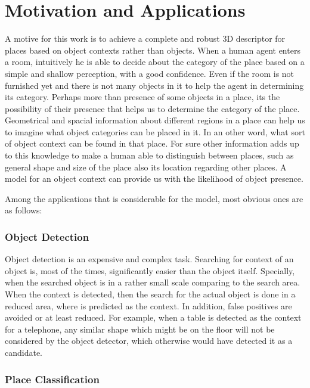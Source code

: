 \section{Motivation and Applications}
\label{MotivationandApplications.sec}
A motive for this work is to achieve a complete and robust 3D descriptor for places based on object contexts 
rather than objects. 
When a human agent enters a room, intuitively he is able to decide about the category of the place based on a simple and 
shallow perception, with a good confidence. 
Even if the room is not furnished yet and there is not many objects in it to help the agent in determining its 
category. 
Perhaps more than presence of some objects in a place, its the possibility of their presence that helps us 
to determine the category of the place. Geometrical and spacial information about different regions in a place can help us to imagine what object categories can be placed in it. In an other word, what sort of object context can be found in that place. 
For sure other information adds up to this knowledge to make a human able to distinguish between places, such as general 
shape and size of the place also its location regarding other places. 
A model for an object context can provide us with the likelihood of object presence.

Among the applications that is considerable for the model, most obvious ones are as follows:


\subsubsection*{Object Detection}

Object detection is an expensive and complex task. Searching for context of 
an object is, most of the times, significantly easier than the object itself. Specially, when the searched object is in a rather small scale comparing to the search area. 
When the context is detected, then the search for the actual object is done in a reduced area, where is predicted as the context. 
In addition, false positives are avoided or at least reduced. For example, when a table is detected as the context for a telephone, any similar shape which might be on the floor will not be considered by the object detector, which otherwise would have detected it as a candidate. 

\subsubsection*{Place Classification}
 
